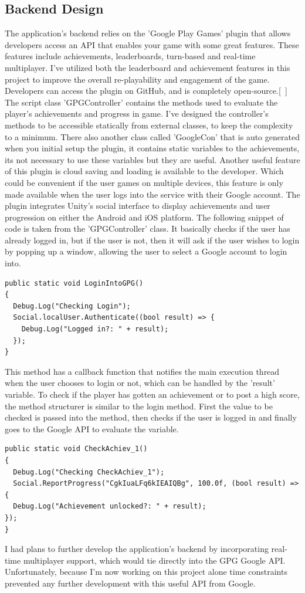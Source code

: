 \subsection{Backend Design}
The application's backend relies on the 'Google Play Games' plugin that allows developers access an API that enables your game with some great features. These features include achievements, leaderboards, turn-based and real-time multiplayer. I've utilized both the leaderboard and achievement features in this project to improve the overall re-playability and engagement of the game. Developers can access the plugin on GitHub, and is completely open-source.[~\cite{GPG-Plugin}] The script class 'GPGController' contains the methods used to evaluate the player's achievements and progress in game. I've designed the controller's methods to be accessible statically from external classes, to keep the complexity to a minimum. There also another class called 'GoogleCon' that is auto generated when you initial setup the plugin, it contains static variables to the achievements, its not necessary to use these variables but they are useful. Another useful feature of this plugin is cloud saving and loading is available to the developer. Which could be convenient if the user games on multiple devices, this feature is only made available when the user logs into the service with their Google account. The plugin integrates Unity's social interface to display achievements and user progression on either the Android and iOS platform.
The following snippet of code is taken from the 'GPGController' class. It basically checks if the user has already logged in, but if the user is not, then it will ask if the user wishes to login by popping up a window, allowing the user to select a Google account to login into.
\begin{verbatim}
public static void LoginIntoGPG()
{
  Debug.Log("Checking Login");
  Social.localUser.Authenticate((bool result) => {
    Debug.Log("Logged in?: " + result);
  });
}
\end{verbatim}
This method has a callback function that notifies the main execution thread when the user chooses to login or not, which can be handled by the 'result' variable. To check if the player has gotten an achievement or to post a high score, the method structurer is similar to the login method. First the value to be checked is passed into the method, then checks if the user is logged in and finally goes to the Google API to evaluate the variable.
\begin{verbatim}
public static void CheckAchiev_1()
{
  Debug.Log("Checking CheckAchiev_1");
  Social.ReportProgress("CgkIuaLFq6kIEAIQBg", 100.0f, (bool result) => {
  Debug.Log("Achievement unlocked?: " + result);
});
}
\end{verbatim}
I had plans to further develop the application's backend by incorporating real-time multiplayer support, which would tie directly into the GPG Google API. Unfortunately, because I'm now working on this project alone time constraints prevented any further development with this useful API from Google.
